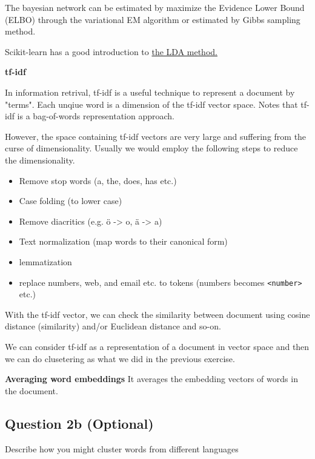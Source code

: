\documentclass{kthreport}
\begin{document}
The bayesian network can be estimated by maximize the Evidence Lower Bound (ELBO)
through the variational EM algorithm or estimated by Gibbs sampling method.

Scikit-learn has a good introduction to
\href{https://scikit-learn.org/stable/modules/decomposition.html#latentdirichletallocation}{the LDA method.}

\textbf{tf-idf}

In information retrival, tf-idf is a useful technique to represent a document by
"terms". Each unqiue word is a dimension of the tf-idf vector space. Notes that
tf-idf is a bag-of-words representation approach.

However, the space containing tf-idf vectors are very large and suffering from
the curse of dimensionality. Usually we would employ the following steps to
reduce the dimensionality.

\begin{itemize}
    \item Remove stop words (a, the, does, has etc.)
    \item Case folding (to lower case)
    \item Remove diacritics (e.g. ö -> o, ä -> a)
    \item Text normalization (map words to their canonical form)
    \item lemmatization
    \item replace numbers, web, and email etc. to tokens (numbers becomes \texttt{<number>} etc.)
\end{itemize}

With the tf-idf vector, we can check the similarity between document
using cosine distance (similarity) and/or Euclidean distance and so-on.

We can consider tf-idf as a representation of a document in vector space and then
we can do clusetering as what we did in the previous exercise.

\textbf{Averaging word embeddings}
It averages the embedding vectors of words in the document.


\subsection{Question 2b (Optional)}
Describe how you might cluster words from different languages
\end{document}
